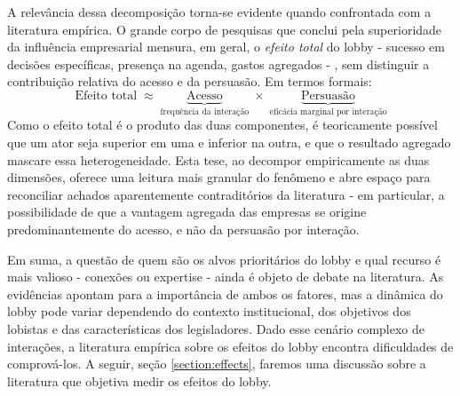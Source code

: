 A relevância dessa decomposição torna-se evidente quando confrontada com a literatura empírica. O grande corpo de pesquisas que conclui pela superioridade da influência empresarial \cite{schlozman1986organized, schlozman1984accent, baumgartner2009lobbying} mensura, em geral, o \textit{efeito total} do lobby - sucesso em decisões específicas, presença na agenda, gastos agregados - , sem distinguir a contribuição relativa do acesso e da persuasão. Em termos formais:
\begin{equation}
    \text{Efeito total} \;\approx\; \underbrace{\text{Acesso}}_{\text{frequência da interação}} \;\times\; \underbrace{\text{Persuasão}}_{\text{eficácia marginal por interação}}
\end{equation}
Como o efeito total é o produto das duas componentes, é teoricamente possível que um ator seja superior em uma e inferior na outra, e que o resultado agregado mascare essa heterogeneidade. Esta tese, ao decompor empiricamente as duas dimensões, oferece uma leitura mais granular do fenômeno e abre espaço para reconciliar achados aparentemente contraditórios da literatura - em particular, a possibilidade de que a vantagem agregada das empresas se origine predominantemente do acesso, e não da persuasão por interação.

Em suma, a questão de quem são os alvos prioritários do lobby e qual recurso é mais valioso - conexões ou expertise - ainda é objeto de debate na literatura. As evidências apontam para a importância de ambos os fatores, mas a dinâmica do lobby pode variar dependendo do contexto institucional, dos objetivos dos lobistas e das características dos legisladores. Dado esse cenário complexo de interações, a literatura empírica sobre os efeitos do lobby encontra dificuldades de comprová-los. A seguir, seção \ref{section:effects}, faremos uma discussão sobre a literatura que objetiva medir os efeitos do lobby.

